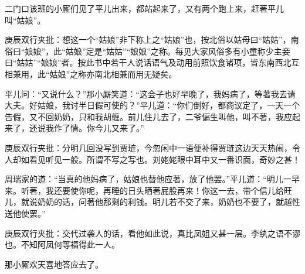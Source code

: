 \begin{parag}


    二门口该班的小厮们见了平儿出来，都站起来了，又有两个跑上来，赶著平儿叫“姑娘”。\begin{note}庚辰双行夹批：想这一个“姑娘”非下称上之“姑娘”也，按北俗以姑母曰“姑姑”，南俗曰“娘娘”，此“姑娘”定是“姑姑”“娘娘”之称。每见大家风俗多有小童称少主妾曰“姑姑”“娘娘”者。按此书中若干人说话语气及动用前照饮食诸项，皆东南西北互相兼用，此“姑娘”之称亦南北相兼而用无疑矣。\end{note}平儿问：“又说什么？”那小厮笑道：“这会子也好早晚了，我妈病了，等著我去请大夫。好姑娘，我讨半日假可使的？”平儿道：“你们倒好，都商议定了，一天一个告假，又不回奶奶，只和我胡缠。前儿住儿去了，二爷偏生叫他，叫不著，我应起来了，还说我作了情。你今儿又来了。”\begin{note}庚辰双行夹批：分明几回没写到贾琏，今忽闲中一语便补得贾琏这边天天热闹，令人却如看见听见一般。所谓不写之写也。刘姥姥眼中耳中又一番识面，奇妙之甚！\end{note}周瑞家的道：“当真的他妈病了，姑娘也替他应著，放了他罢。”平儿道：“明儿一早来。听著，我还要使你呢，再睡的日头晒著屁股再来！你这一去，带个信儿给旺儿，就说奶奶的话，问著他那剩的利钱。明儿若不交了来，奶奶也不要了，就越性送他使罢。”\begin{note}庚辰双行夹批：交代过袭人的话，看他如此说，真比凤姐又甚一层。李纨之语不谬也。不知阿凤何等福得此一人。\end{note}那小厮欢天喜地答应去了。
\end{parag}


